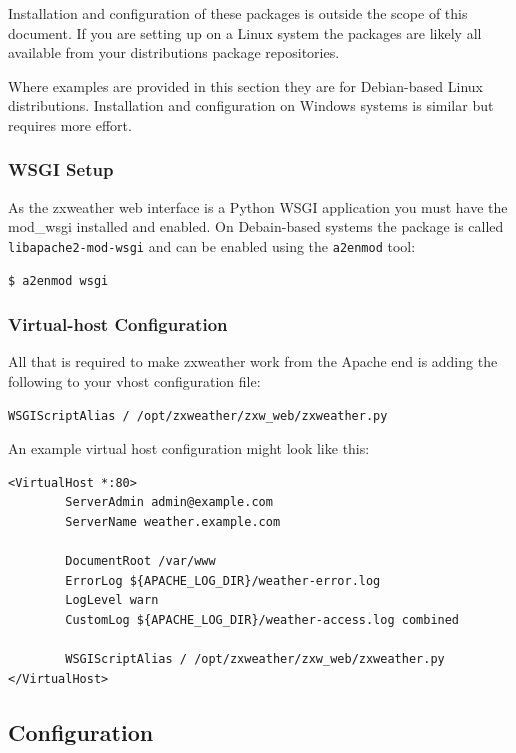 \documentclass[a4paper,10pt,draft]{book}
\begin{document}
Installation and configuration of these packages is outside the scope of this document. If you are setting up on a Linux system the packages are likely all available from your distributions package repositories. 

Where examples are provided in this section they are for Debian-based Linux distributions. Installation and configuration on Windows systems is similar but requires more effort.

\subsubsection{WSGI Setup}
As the zxweather web interface is a Python WSGI application you must have the mod\_wsgi installed and enabled. On Debain-based systems the package is called \verb|libapache2-mod-wsgi| and can be enabled using the \verb|a2enmod| tool:

\begin{verbatim}
$ a2enmod wsgi
\end{verbatim}

\subsubsection{Virtual-host Configuration}

All that is required to make zxweather work from the Apache end is adding the following to your vhost configuration file:
\begin{verbatim}
WSGIScriptAlias / /opt/zxweather/zxw_web/zxweather.py
\end{verbatim}

An example virtual host configuration might look like this:

\begin{verbatim}
<VirtualHost *:80>
        ServerAdmin admin@example.com
        ServerName weather.example.com

        DocumentRoot /var/www
        ErrorLog ${APACHE_LOG_DIR}/weather-error.log
        LogLevel warn
        CustomLog ${APACHE_LOG_DIR}/weather-access.log combined

        WSGIScriptAlias / /opt/zxweather/zxw_web/zxweather.py
</VirtualHost>
\end{verbatim}

\subsection{Configuration}
\end{document}
